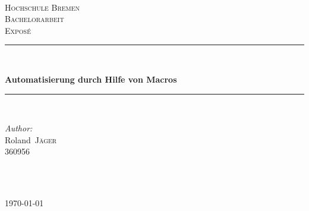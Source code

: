 \documentclass[german,a4paper,12pt,parskip=half]{scrartcl}
\newcommand{\MetaInstitute}{Hochschule Bremen}
\newcommand{\MetaUnit}{Bachelorarbeit}
\newcommand{\MetaTask}{Expos\'e}
\newcommand{\MetaTitle}{Automatisierung durch Hilfe von Macros}
\newcommand{\MetaAuthorName}{Roland}
\newcommand{\MetaAuthorSurname}{Jäger}
\newcommand{\MetaStudentNumber}{360956}
\newcommand{\HRule}{\rule{\linewidth}{0.2mm}}
\begin{document}
\begin{titlepage}
  \shortdate %
  \center %

  ~\\[2cm]
  \textsc{\LARGE \MetaInstitute}\\[1.5cm] %
  \textsc{\Large \MetaUnit}\\[0.5cm] %
  \textsc{\large \MetaTask}\\[2cm] %

  \HRule \\[0.5cm]
  {
    \LARGE \bfseries \MetaTitle \\[0.50cm] %
    \par
  }
  \HRule \\[1.5cm]

  \begin{minipage}{0.4\textwidth}
    \begin{flushleft}
      \large
        \emph{Author:}\\
        \MetaAuthorName~\textsc{\MetaAuthorSurname}\\
      \small \MetaStudentNumber
    \end{flushleft}
  \end{minipage}
  ~
  \begin{minipage}{0.4\textwidth}
    \begin{flushright}

    \end{flushright}
  \end{minipage}\\[4cm]

  \vspace*{\fill}
  {
    \large \today
  }
\end{titlepage}


\tableofcontents
\newpage
\end{document}
